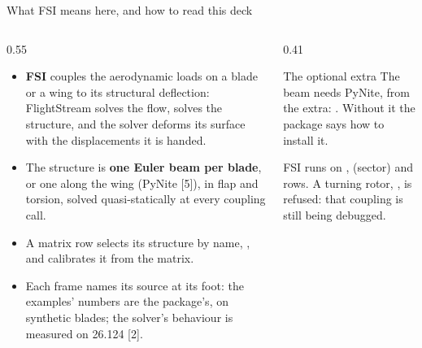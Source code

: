 %

\begin{frame}{What FSI means here, and how to read this deck}
\begin{columns}[T]
\begin{column}{0.55\textwidth}
\begin{itemize}\small
  \item \textbf{FSI} couples the aerodynamic loads on a blade or a wing to
        its structural deflection: FlightStream solves the flow, \pkgname{}
        solves the structure, and the solver deforms its surface with the
        displacements it is handed.
  \item The structure is \textbf{one Euler beam per blade}, or one along the
        wing (PyNite [5]), in flap and torsion, solved quasi-statically at
        every coupling call.
  \item A matrix row selects its structure by name, , and
        calibrates it from the matrix.
  \item Each frame names its source at its foot: the examples' numbers are
        the package's, on synthetic blades; the solver's behaviour is measured
        on 26.124 [2].
\end{itemize}
\end{column}
\begin{column}{0.41\textwidth}
\begin{block}{The optional extra}
\small The beam needs PyNite, from the \code{[fsi]} extra:
. Without it the package says how to
install it.
\end{block}
\begin{takeaway}
FSI runs on ,  (sector) and 
rows. A turning rotor, , is refused: that coupling is
still being debugged.
\end{takeaway}
\end{column}
\end{columns}
\end{frame}

